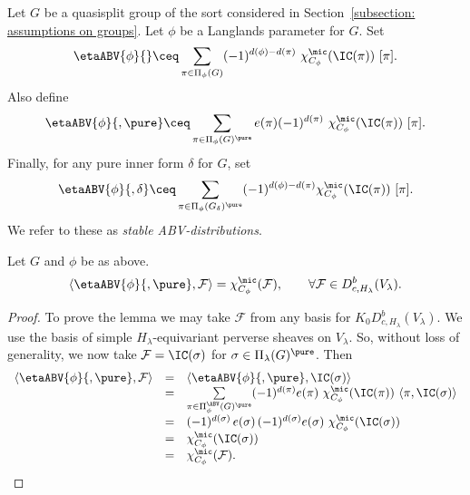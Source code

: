 \documentclass[11pt,letterpaper]{amsart}
\numberwithin{equation}{section}
\begin{document}
\begin{definition}\label{definition: stable etaABV}
    Let $G$ be a quasisplit group of the sort considered in Section~\ref{subsection: assumptions on groups}.
    Let $\phi$ be a Langlands parameter for $G$.
    Set
    \[
\etaABV{\phi}{}
\ceq
\sum_{\pi \in \Pi_{\phi}(G)} 
(-1)^{d(\phi) - d(\pi)}\ \chi^\mic_{C_\phi}(\IC(\pi)) \ [\pi].
\]
Also define
   \[
\etaABV{\phi}{,\pure}
\ceq
\sum_{\pi \in \Pi_{\phi}(G)^\pure} e(\pi) 
(-1)^{d(\pi)}\ 
\chi^\mic_{C_\phi}(\IC(\pi))  \ [\pi].
\]
Finally, for any pure inner form $\delta$ for $G$, set
  \[
\etaABV{\phi}{,\delta}
\ceq
\sum_{\pi \in \Pi_{\phi}(G_\delta)^\pure} (-1)^{d(\phi) - d(\pi)} 
\chi^\mic_{C_\phi}(\IC(\pi)) \ [\pi] .
\]
We refer to these as {\it stable ABV-distributions}.
\end{definition}

\begin{lemma}\label{lemma: NEvs and chimic}
Let $G$ and $\phi$ be as above.
    \[
\langle
\etaABV{\phi}{,\pure}, \mathcal{F} \rangle
=
\chi^\mic_{C_\phi}(\mathcal{F}),
\qquad\forall \mathcal{F}\in D^b_{c,H_\lambda}(V_\lambda).
\]
\end{lemma}

\begin{proof}
To prove the lemma we may take $\mathcal{F}$ from any basis for $K_0 D^b_{c,H_\lambda}(V_\lambda)$.
We use the basis of simple $H_\lambda$-equivariant perverse sheaves on $V_\lambda$. So, without loss of generality, we now take $\mathcal{F} = \IC(\sigma)$ for $\sigma \in \Pi_\lambda(G)^\pure$.
Then
\[
\begin{array}{rcl}
\langle
\etaABV{\phi}{,\pure}, \mathcal{F}
\rangle
&=& 
\langle
\etaABV{\phi}{,\pure}, \IC(\sigma)
\rangle \\
&=&
\mathop{\sum}\limits_{\pi\in \Pi_\phi^{\ABV}(G)^\pure} (-1)^{d(\pi)} e(\pi)\ \chi^\mic_{C_\phi}(\IC(\pi)) \ 
\langle \pi, \IC(\sigma)\rangle \\
&=& 
(-1)^{d(\sigma)}\, e(\sigma) \, (-1)^{d(\sigma)} e(\sigma)\ 
\chi^\mic_{C_\phi}(\IC(\sigma))  \\
&=&
\chi^\mic_{C_\phi}(\IC(\sigma)) 
\\
&=&
\chi^\mic_{C_\phi}(\mathcal{F}).
\end{array}
\]
\end{proof}
\end{document}
